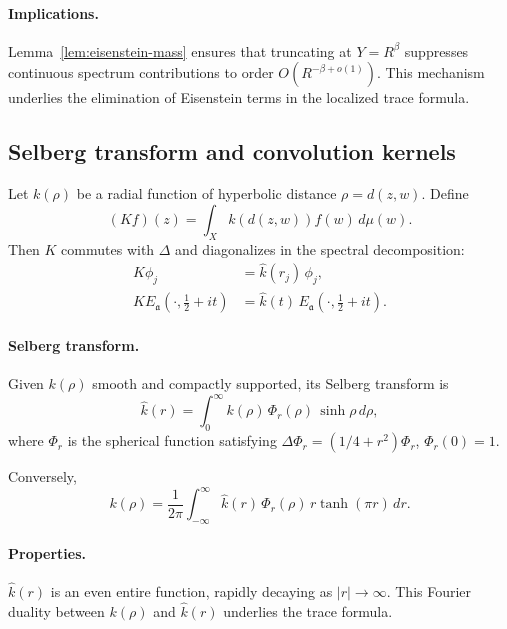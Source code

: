 \paragraph{Implications.}
Lemma~\ref{lem:eisenstein-mass} ensures that truncating at $Y=R^\beta$ suppresses continuous spectrum contributions to order $O(R^{-\beta+o(1)})$. This mechanism underlies the elimination of Eisenstein terms in the localized trace formula.

\medskip

\subsection{Selberg transform and convolution kernels}\label{subsec:selberg}

Let $k(\rho)$ be a radial function of hyperbolic distance $\rho=d(z,w)$. Define
\begin{equation}\label{eq:radial-operator}
  (Kf)(z) = \int_X k(d(z,w)) f(w)\,d\mu(w).
\end{equation}
Then $K$ commutes with $\Delta$ and diagonalizes in the spectral decomposition:
\begin{align}
  K\phi_j &= \widehat{k}(r_j)\,\phi_j, \label{eq:selberg-cusp}\\
  K E_\mathfrak{a}(\cdot,\tfrac12+it) &= \widehat{k}(t)\,E_\mathfrak{a}(\cdot,\tfrac12+it). \label{eq:selberg-eisenstein}
\end{align}

\paragraph{Selberg transform.}
Given $k(\rho)$ smooth and compactly supported, its Selberg transform is
\begin{equation}\label{eq:selberg-transform}
  \widehat{k}(r) = \int_0^\infty k(\rho)\,\Phi_r(\rho)\,\sinh\rho\,d\rho,
\end{equation}
where $\Phi_r$ is the spherical function satisfying $\Delta \Phi_r = (1/4+r^2)\Phi_r$, $\Phi_r(0)=1$.

Conversely,
\begin{equation}\label{eq:selberg-inversion}
  k(\rho) = \frac{1}{2\pi}\int_{-\infty}^\infty
  \widehat{k}(r)\,\Phi_r(\rho)\,r\tanh(\pi r)\,dr.
\end{equation}

\paragraph{Properties.}
$\widehat{k}(r)$ is an even entire function, rapidly decaying as $|r|\to\infty$. This Fourier duality between $k(\rho)$ and $\widehat{k}(r)$ underlies the trace formula.


